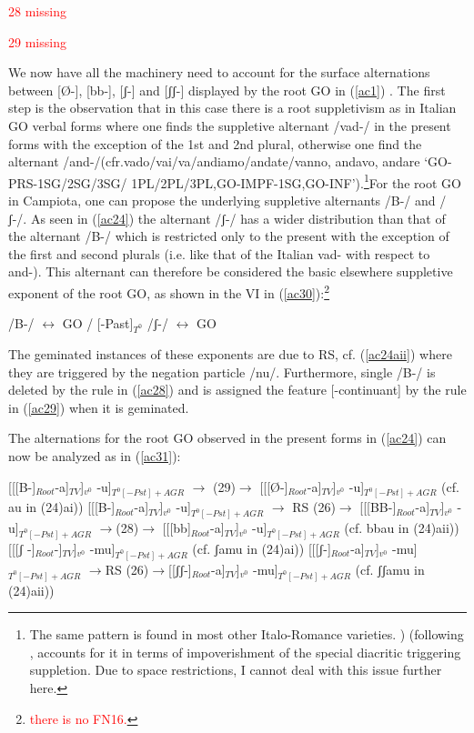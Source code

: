 \documentclass[output=paper]{langscibook}
\begin{document}
\ea \label{ac28}\textcolor{red}{28 missing}
\z

\ea \textcolor{red}{29 missing}
\z

We now have all the machinery need to account for the surface alternations between [Ø-], [bb-], [ʃ-]  and [ʃʃ-]  displayed by the root GO in (\ref{ac1}) . The first step is the observation that in this case there is a root suppletivism as in Italian GO verbal forms where one finds the suppletive alternant /vad-/ in the present forms with the exception of the 1st and 2nd plural, otherwise one find the alternant /and-/(cfr.vado/vai/va/andiamo/andate/vanno,  andavo,  andare ‘GO-PRS-1SG/2SG/3SG/ 1PL/2PL/3PL,GO-IMPF-1SG,GO-INF’).\footnote{The same pattern is found in most other Italo-Romance varieties. \cite{calabrese2012a, calabrese2015a}) (following \cite{embick2010a}, accounts for it in terms of impoverishment of the special diacritic triggering suppletion. Due to space restrictions, I cannot deal with this issue further here.}For the root GO in Campiota, one can propose the underlying suppletive alternants  /B-/  and  /  ʃ-/. As seen in  (\ref{ac24})  the alternant  /ʃ-/  has a wider distribution than that of the alternant  /B-/ which is restricted only to the present with the exception of the first and second plurals (i.e. like that of the Italian  vad- with respect to  and-).  This alternant can therefore be considered the basic elsewhere suppletive exponent of the root GO, as shown in the VI in (\ref{ac30}):\footnote{\textcolor{red}{there is no FN16.}}

\ea\label{ac30}
    \ea \label{ac30a}/B-/ $\longleftrightarrow$ GO / \underline{\hspace{2em}}  [-Past]$_{T^0}$
    \ex\label{ac30b} /ʃ-/ $\longleftrightarrow$ GO
    \z
\z

The geminated instances of these exponents are due to RS, cf. (\ref{ac24aii}) where they are triggered by the negation particle /nu/. Furthermore, single /B-/ is deleted by the rule in (\ref{ac28}) and is assigned the feature [-continuant] by the rule in (\ref{ac29}) when it is geminated.

The alternations for the root GO observed in the present forms in (\ref{ac24}) can now be analyzed as in (\ref{ac31}):

\ea\label{ac31}
    \ea \label{ac31a}{[[[B-]}$_{Root}$-a]$_{TV}$]$_{v^0}$ -u]$_{T^0 [-Pst]+AGR}$ $\rightarrow$ (29)$\rightarrow$ [[[Ø-]$_{Root}$-a]$_{TV}$]$_{v^0}$ -u]$_{T^0 [-Pst]+AGR}$        (cf. au in (24)ai))
    \ex \label{ac31b}{[[[B-]}$_{Root}$-a]$_{TV}$]$_{v^0}$ -u]$_{T^0 [-Pst]+AGR}$ $\rightarrow$ RS (26)$\rightarrow$ [[[BB-]$_{Root}$-a]$_{TV}$]$_{v^0}$ -u]$_{T^0 [-Pst]+AGR}$      $\rightarrow$(28)$\rightarrow$ [[[bb]$_{Root}$-a]$_{TV}$]$_{v^0}$ -u]$_{T^0 [-Pst]+AGR}$   (cf. bbau in (24)aii)) 
    \ex \label{ac31c}{[[[ʃ -]}$_{Root}$-]$_{TV}$]$_{v^0}$ -mu]$_{T^0 [-Pst]+AGR}$ (cf. ʃamu in (24)ai))
    \ex \label{ac31d}{[[[ʃ-]}$_{Root}$-a]$_{TV}$]$_{v^0}$ -mu]$_{T^0 [-Pst]+AGR}$ $\rightarrow$RS (26)$\rightarrow$[[ʃʃ-]$_{Root}$-a]$_{TV}$]$_{v^0}$ -mu]$_{T^0 [-Pst]+AGR}$           (cf. ʃʃamu in (24)aii))
    \z
\z
\end{document}
